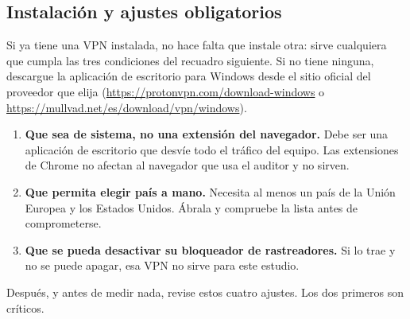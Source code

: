\documentclass[11pt,a4paper]{article}
\begin{document}
\subsection{Instalación y ajustes obligatorios}

Si ya tiene una VPN instalada, no hace falta que instale otra: sirve cualquiera que cumpla las tres condiciones del recuadro siguiente. Si no tiene ninguna, descargue la aplicación de escritorio para Windows desde el sitio oficial del proveedor que elija (\url{https://protonvpn.com/download-windows} o \url{https://mullvad.net/es/download/vpn/windows}).

\begin{nota}
	\begin{enumerate}
		\item \textbf{Que sea de sistema, no una extensión del navegador.} Debe ser una aplicación de escritorio que desvíe todo el tráfico del equipo. Las extensiones de Chrome no afectan al navegador que usa el auditor y no sirven.
		\item \textbf{Que permita elegir país a mano.} Necesita al menos un país de la Unión Europea y los Estados Unidos. Ábrala y compruebe la lista antes de comprometerse.
		\item \textbf{Que se pueda desactivar su bloqueador de rastreadores.} Si lo trae y no se puede apagar, esa VPN no sirve para este estudio.
	\end{enumerate}
\end{nota}

Después, y antes de medir nada, revise estos cuatro ajustes. Los dos primeros son críticos.
\end{document}
